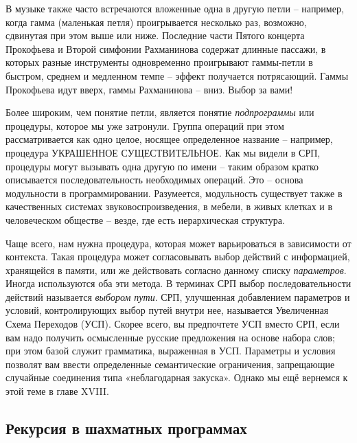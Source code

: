 \documentclass[../main.tex]{subfiles}
\begin{document}
В музыке также часто встречаются вложенные одна в другую петли \--- например, когда гамма (маленькая петля) проигрывается несколько раз, возможно, сдвинутая при этом выше или ниже. Последние части Пятого концерта Прокофьева и Второй симфонии Рахманинова содержат длинные пассажи, в которых разные инструменты одновременно проигрывают гаммы-петли в быстром, среднем и медленном темпе \--- эффект получается потрясающий. Гаммы Прокофьева идут вверх, гаммы Рахманинова \--- вниз. Выбор за вами!

Более широким, чем понятие петли, является понятие \emph{подпрограммы} или процедуры, которое мы уже затронули. Группа операций при этом рассматривается как одно целое, носящее определенное название \--- например, процедура УКРАШЕННОЕ СУЩЕСТВИТЕЛЬНОЕ\@. Как мы видели в СРП, процедуры могут вызывать одна другую по имени \--- таким образом кратко описывается последовательность необходимых операций. Это \--- основа модульности в программировании. Разумеется, модульность существует также в качественных системах звуковоспроизведения, в мебели, в живых клетках и в человеческом обществе \--- везде, где есть иерархическая структура.

Чаще всего, нам нужна процедура, которая может варьироваться в зависимости от контекста. Такая процедура может согласовывать выбор действий с информацией, хранящейся в памяти, или же действовать согласно данному списку \emph{параметров}. Иногда используются оба эти метода. В терминах СРП выбор последовательности действий называется \emph{выбором пути}. СРП, улучшенная добавлением параметров и условий, контролирующих выбор путей внутри нее, называется Увеличенная Схема Переходов (УСП). Скорее всего, вы предпочтете УСП вместо СРП, если вам надо получить осмысленные русские предложения на основе набора слов; при этом базой служит грамматика, выраженная в УСП\@. Параметры и условия позволят вам ввести определенные семантические ограничения, запрещающие случайные соединения типа «неблагодарная закуска». Однако мы ещё вернемся к этой теме в главе XVIII.


\subsection{Рекурсия в шахматных программах}
\end{document}
